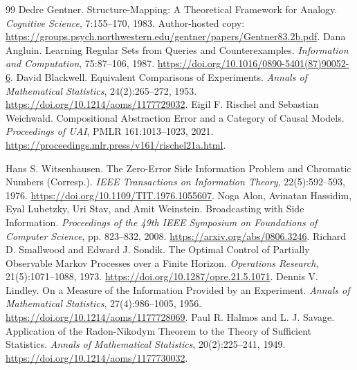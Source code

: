 \documentclass[11pt,letterpaper]{article}
\theoremstyle{plain}
\theoremstyle{definition}
\begin{document}
\begin{thebibliography}{99}
 Dedre Gentner. Structure-Mapping: A Theoretical Framework for Analogy. \emph{Cognitive Science}, 7:155--170, 1983. Author-hosted copy: \url{https://groups.psych.northwestern.edu/gentner/papers/Gentner83.2b.pdf}.
 Dana Angluin. Learning Regular Sets from Queries and Counterexamples. \emph{Information and Computation}, 75:87--106, 1987. \url{https://doi.org/10.1016/0890-5401(87)90052-6}.
 David Blackwell. Equivalent Comparisons of Experiments. \emph{Annals of Mathematical Statistics}, 24(2):265--272, 1953. \url{https://doi.org/10.1214/aoms/1177729032}.
 Eigil F. Rischel and Sebastian Weichwald. Compositional Abstraction Error and a Category of Causal Models. \emph{Proceedings of UAI}, PMLR 161:1013--1023, 2021. \url{https://proceedings.mlr.press/v161/rischel21a.html}.

 Hans S. Witsenhausen. The Zero-Error Side Information Problem and Chromatic Numbers (Corresp.). \emph{IEEE Transactions on Information Theory}, 22(5):592--593, 1976. \url{https://doi.org/10.1109/TIT.1976.1055607}.
 Noga Alon, Avinatan Hassidim, Eyal Lubetzky, Uri Stav, and Amit Weinstein. Broadcasting with Side Information. \emph{Proceedings of the 49th IEEE Symposium on Foundations of Computer Science}, pp. 823--832, 2008. \url{https://arxiv.org/abs/0806.3246}.
 Richard D. Smallwood and Edward J. Sondik. The Optimal Control of Partially Observable Markov Processes over a Finite Horizon. \emph{Operations Research}, 21(5):1071--1088, 1973. \url{https://doi.org/10.1287/opre.21.5.1071}.
 Dennis V. Lindley. On a Measure of the Information Provided by an Experiment. \emph{Annals of Mathematical Statistics}, 27(4):986--1005, 1956. \url{https://doi.org/10.1214/aoms/1177728069}.
 Paul R. Halmos and L. J. Savage. Application of the Radon-Nikodym Theorem to the Theory of Sufficient Statistics. \emph{Annals of Mathematical Statistics}, 20(2):225--241, 1949. \url{https://doi.org/10.1214/aoms/1177730032}.
\end{thebibliography}
\end{document}
